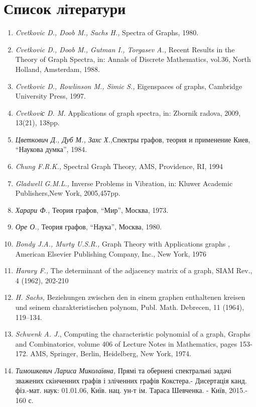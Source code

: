  \section{Список літератури}
\begin{enumerate}

\item{{\it Cvetkovic D., Doob M., Sachs H.,} Spectra of Graphs, 1980.}

\item{{\it Cvetkovic D., Doob M., Gutman I., Torgasev A.,} Recent Results in the Theory of Graph Spectra, in: Annals of Discrete Mathematics, vol.36, North
Holland, Amsterdam, 1988.}

\item{{\it Cvetkovic D., Rowlinson M., Simic S.,} Eigenspaces of graphs, Cambridge University Press, 1997.}


\item{{\it Cvetkoviс D. M.} Applications of graph spectra, in: Zbornik radova, 2009, 13(21), 138pp.}

\item{{\it Цветкович Д., Дуб М., Захс Х.,}Спектры графов, теория и
применение Киев, ``Наукова думка'', 1984.}

\item{{\it Chung F.R.K.,} Spectral Graph Theory, AMS, Providence,
RI,  1994}

\item{{\it Gladwell G.M.L.,} Inverse Problems in Vibration, in: Kluwer Academic Publishers,New York, 2005,457pp.}

\item{{\it Харари Ф.,} Теория графов, ``Мир'', Москва, 1973.}

\item{{\it Оре О.,} Теория графов, ``Наука'', Москва, 1980.}

\item{{\it Bondy J.A., Murty U.S.R.,} Graph Theory with Applications graphs
, American Elsevier Publishing Company, Inc., New York, 1976}

\item{{\it Harary F.,} The determinant of the adjacency matrix of a
graph, SIAM Rev., 4 (1962), 202-210}

\item{{\it H. Sachs,} Beziehungen zwischen den in einem graphen enthaltenen
kreisen und seinem charakteristischen polynom, Publ. Math. Debrecen,
11 (1964), 119–134.}

\item{{\it Schwenk A. J.}, Computing the characteristic polynomial of a graph, Graphs and Combinatorics, volume 406 of Lecture Notes in Mathematics, pages 153-172. AMS, Springer, Berlin, Heidelberg, New York, 1974.}


\item{{\it Тимошкевич Лариса Миколаївна,} Прямі та обернені спектральні задачі зважених скінченних графів і зліченних графів Кокстера.- Дисертація канд. фіз.-мат. наук: 01.01.06, Київ. нац. ун-т ім. Тараса Шевченка. - Київ, 2015.- 160 с.} 
\end{enumerate}
